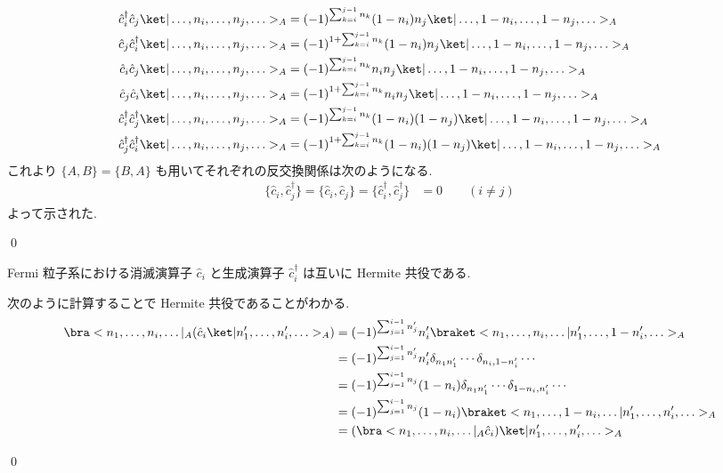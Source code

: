 \documentclass[uplatex,dvipdfmx,a4paper,11pt]{jlreq}
\makeatletter
\numberwithin{equation}{section}
\theoremstyle{definition}
\renewenvironment{proof}[1][\proofname]{\par
  \normalfont
  \topsep6\p@\@plus6\p@ \trivlist
  \item[\hskip\labelsep{\bfseries #1}\@addpunct{\bfseries}]\ignorespaces\quad\par
}{
  \qed\endtrivlist\@endpefalse
}
\renewcommand\proofname{証明}
\makeatother
\begin{document}
\begin{proof}
\begin{align}
    \hat{c}_i^\dagger\hat{c}_j\ket|\ldots,n_i,\ldots,n_j,\ldots>_A         & = (-1)^{\sum_{k=i}^{j-1}n_k}(1 - n_i)n_j\ket|\ldots,1-n_i,\ldots,1-n_j,\ldots>_A           \\
    \hat{c}_j\hat{c}_i^\dagger\ket|\ldots,n_i,\ldots,n_j,\ldots>_A         & = (-1)^{1 + \sum_{k=i}^{j-1}n_k}(1 - n_i)n_j\ket|\ldots,1-n_i,\ldots,1-n_j,\ldots>_A       \\
    \hat{c}_i\hat{c}_j\ket|\ldots,n_i,\ldots,n_j,\ldots>_A                 & = (-1)^{\sum_{k=i}^{j-1}n_k}n_in_j\ket|\ldots,1-n_i,\ldots,1-n_j,\ldots>_A                 \\
    \hat{c}_j\hat{c}_i\ket|\ldots,n_i,\ldots,n_j,\ldots>_A                 & = (-1)^{1 + \sum_{k=i}^{j-1}n_k}n_in_j\ket|\ldots,1-n_i,\ldots,1-n_j,\ldots>_A             \\
    \hat{c}_i^\dagger\hat{c}_j^\dagger\ket|\ldots,n_i,\ldots,n_j,\ldots>_A & = (-1)^{\sum_{k=i}^{j-1}n_k}(1 - n_i)(1 - n_j)\ket|\ldots,1-n_i,\ldots,1-n_j,\ldots>_A     \\
    \hat{c}_j^\dagger\hat{c}_i^\dagger\ket|\ldots,n_i,\ldots,n_j,\ldots>_A & = (-1)^{1 + \sum_{k=i}^{j-1}n_k}(1 - n_i)(1 - n_j)\ket|\ldots,1-n_i,\ldots,1-n_j,\ldots>_A
  \end{align}
  これより $\{A, B\} = \{B, A\}$ も用いてそれぞれの反交換関係は次のようになる.
  \begin{align}
    \{\hat{c}_i, \hat{c}_j^\dagger\} = \{\hat{c}_i, \hat{c}_j\} = \{\hat{c}_i^\dagger, \hat{c}_j^\dagger\} & = 0 \qquad (i\neq j)
  \end{align}
  よって示された.
\end{proof}

\begin{proposition}[Q21-53(i)(ii)]
  Fermi 粒子系における消滅演算子 $\hat{c}_i$ と生成演算子 $\hat{c}_i^\dagger$ は互いに Hermite 共役である.
\end{proposition}
\begin{proof}
  次のように計算することで Hermite 共役であることがわかる.
  \begin{align}
    \bra<n_1,\ldots,n_i,\ldots|_A(\hat{c}_i\ket|n_1',\ldots,n_i',\ldots>_A) & = (-1)^{\sum_{j=1}^{i-1}n_j'}n_i'\braket<n_1,\ldots,n_i,\ldots|n_1',\ldots,1-n_i',\ldots>_A       \\
                                                                            & = (-1)^{\sum_{j=1}^{i-1}n_j'}n_i'\delta_{n_1n_1'}\cdots\delta_{n_i,1-n_i'}\cdots                  \\
                                                                            & = (-1)^{\sum_{j=1}^{i-1}n_j}(1 - n_i)\delta_{n_1n_1'}\cdots\delta_{1-n_i,n_i'}\cdots              \\
                                                                            & = (-1)^{\sum_{j=1}^{i-1}n_j}(1 - n_i)\braket<n_1,\ldots,1 - n_i,\ldots|n_1',\ldots,n_i',\ldots>_A \\
                                                                            & = (\bra<n_1,\ldots,n_i,\ldots|_A \hat{c}_i)\ket|n_1',\ldots,n_i',\ldots>_A
  \end{align}
\end{proof}
\end{document}
